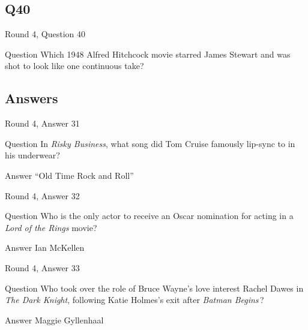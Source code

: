 \documentclass[11pt]{beamer}
\begin{document}
\subsection*{Q40}
\begin{frame}[t]{Round 4, Question 40}
\vspace{2em}
\begin{block}{Question}
Which 1948 Alfred Hitchcock movie starred James Stewart and was shot to look like one continuous take?
\end{block}
\end{frame}
    
\subsection{Answers}

\begin{frame}[t]{Round 4, Answer 31}
\vspace{2em}
\begin{block}{Question}
In \emph{Risky Business}, what song did Tom Cruise famously lip-sync to in his underwear?
\end{block}
\pause{}
\begin{block}{Answer}
``Old Time Rock and Roll''
\end{block}
\end{frame}
    

\begin{frame}[t]{Round 4, Answer 32}
\vspace{2em}
\begin{block}{Question}
Who is the only actor to receive an Oscar nomination for acting in a \emph{Lord of the Rings} movie?
\end{block}
\pause{}
\begin{block}{Answer}
Ian McKellen
\end{block}
\end{frame}
    

\begin{frame}[t]{Round 4, Answer 33}
\vspace{2em}
\begin{block}{Question}
Who took over the role of Bruce Wayne's love interest Rachel Dawes in \emph{The Dark Knight}, following Katie Holmes's exit after \emph{Batman Begins}\,?
\end{block}
\pause{}
\begin{block}{Answer}
Maggie Gyllenhaal
\end{block}
\end{frame}
    
\end{document}

